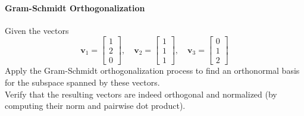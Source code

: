 \documentclass[]{article}
\begin{document}
	
	\paragraph{Gram-Schmidt Orthogonalization}
	Given the vectors
	$$
	\mathbf{v}_1 = \begin{bmatrix}
		1 \\
		2 \\
		0
	\end{bmatrix}, \quad
	\mathbf{v}_2 = \begin{bmatrix}
		1 \\
		1 \\
		1
	\end{bmatrix}, \quad
	\mathbf{v}_3 = \begin{bmatrix}
		0 \\
		1 \\
		2
	\end{bmatrix}
	$$
	Apply the Gram-Schmidt orthogonalization process to find an orthonormal basis for the subspace spanned by these vectors.\\
	Verify that the resulting vectors are indeed orthogonal and normalized (by computing their norm and pairwise dot product).
	
	
\end{document}
